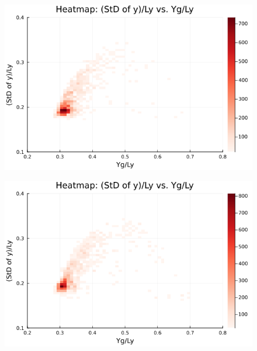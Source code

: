 \begin{figure}[H]
  \centering
  \includegraphics[scale=0.6]{image/RaRtmap10_heat/2023-12-28T12:38:51.586_map_10times_chi1.265_Ay50_rho0.4_T0.43_dT0.04_Rd0.0_Rt0.125_Ra0.4693845_g0.0003999718779659611_run4.0e8.png}
  \label{}
\end{figure}

\begin{figure}[H]
  \centering
  \includegraphics[scale=0.6]{image/RaRtmap10_heat/2023-12-28T12:38:51.670_map_10times_chi1.265_Ay50_rho0.4_T0.43_dT0.04_Rd0.0_Rt0.125_Ra0.938769_g0.0003999718779659611_run4.0e8.png}
  \label{}
\end{figure}

